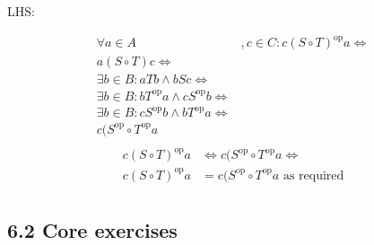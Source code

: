 \documentclass[10pt,\jkfside,a4paper]{article}
\begin{document}
\begin{enumerate}
\begin{enumerate}
\begin{center}
LHS:
\end{center}
\begin{equation}
\begin{split}
\forall a \in A&, c \in C:
c (S \circ T)^{\text{op}} a \Longleftrightarrow \\
a (S \circ T) c \Longleftrightarrow \\
\exists b \in B: a T b \wedge b S c \Longleftrightarrow \\
\exists b \in B: b T^{\text{op}} a \wedge c S^{\text{op}} b \Longleftrightarrow \\
\exists b \in B: c S^{\text{op}} b \wedge b T^{\text{op}} a \Longleftrightarrow \\
c (S^{\text{op}} \circ T^{\text{op}} a \\
\end{split}
\end{equation}
\begin{equation}
\begin{split}
c (S \circ T)^{\text{op}} a &\Longleftrightarrow c (S^{\text{op}} \circ T^{\text{op}} a \Longleftrightarrow \\
c (S \circ T)^{\text{op}} a &= c (S^{\text{op}} \circ T^{\text{op}} a \text{ as required} \\
\end{split}
\end{equation}

\end{enumerate}

\end{enumerate}

\subsection*{6.2 Core exercises}
\end{document}
